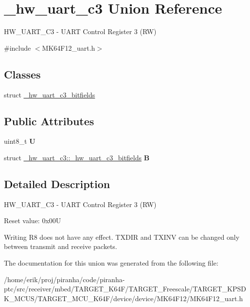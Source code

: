 \hypertarget{union__hw__uart__c3}{}\section{\+\_\+hw\+\_\+uart\+\_\+c3 Union Reference}
\label{union__hw__uart__c3}


H\+W\+\_\+\+U\+A\+R\+T\+\_\+\+C3 -\/ U\+A\+RT Control Register 3 (RW)  




{\ttfamily \#include $<$M\+K64\+F12\+\_\+uart.\+h$>$}

\subsection*{Classes}
\begin{DoxyCompactItemize}
\item 
struct \hyperlink{struct__hw__uart__c3_1_1__hw__uart__c3__bitfields}{\+\_\+hw\+\_\+uart\+\_\+c3\+\_\+bitfields}
\end{DoxyCompactItemize}
\subsection*{Public Attributes}
\begin{DoxyCompactItemize}
\item 
uint8\+\_\+t {\bfseries U}\hypertarget{union__hw__uart__c3_aa8bce1cd1083c1d94503f9aeb1addcf1}{}\label{union__hw__uart__c3_aa8bce1cd1083c1d94503f9aeb1addcf1}

\item 
struct \hyperlink{struct__hw__uart__c3_1_1__hw__uart__c3__bitfields}{\+\_\+hw\+\_\+uart\+\_\+c3\+::\+\_\+hw\+\_\+uart\+\_\+c3\+\_\+bitfields} {\bfseries B}\hypertarget{union__hw__uart__c3_af50788b2b30ff9f597710dded6188bdd}{}\label{union__hw__uart__c3_af50788b2b30ff9f597710dded6188bdd}

\end{DoxyCompactItemize}


\subsection{Detailed Description}
H\+W\+\_\+\+U\+A\+R\+T\+\_\+\+C3 -\/ U\+A\+RT Control Register 3 (RW) 

Reset value\+: 0x00U

Writing R8 does not have any effect. T\+X\+D\+IR and T\+X\+I\+NV can be changed only between transmit and receive packets. 

The documentation for this union was generated from the following file\+:\begin{DoxyCompactItemize}
\item 
/home/erik/proj/piranha/code/piranha-\/ptc/src/receiver/mbed/\+T\+A\+R\+G\+E\+T\+\_\+\+K64\+F/\+T\+A\+R\+G\+E\+T\+\_\+\+Freescale/\+T\+A\+R\+G\+E\+T\+\_\+\+K\+P\+S\+D\+K\+\_\+\+M\+C\+U\+S/\+T\+A\+R\+G\+E\+T\+\_\+\+M\+C\+U\+\_\+\+K64\+F/device/device/\+M\+K64\+F12/M\+K64\+F12\+\_\+uart.\+h\end{DoxyCompactItemize}

